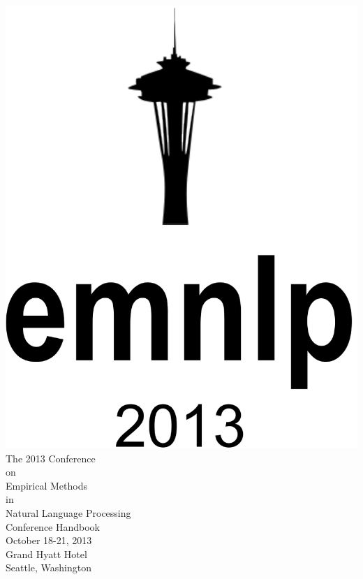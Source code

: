 \thispagestyle{empty}
\noindent
\begin{center}
\includegraphics[height=0.45\textheight]{venue/title-page-crop}\\[0.2in]
\vfill
\Large
The 2013 Conference\\
on\\
Empirical Methods\\
in\\
Natural Language Processing\\
\vfill
\Huge
Conference Handbook\\
\vfill
\Large
October 18-21, 2013\\
Grand Hyatt Hotel\\
Seattle, Washington
\end{center}

\clearpage
{}

\renewcommand{\leftheader}{Message from the General Chair}
\renewcommand{\rightheader}{Message from the General Chair}
\null

\clearpage

